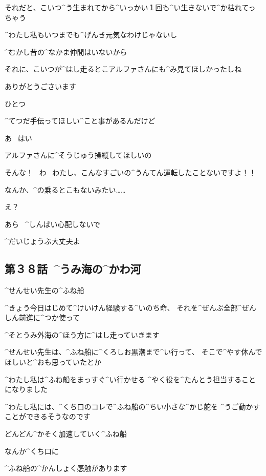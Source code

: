 \Sensei それだと、こいつ^{う}{生}まれてから^{いっかい}{１回}も^{い}{生}きないで^{か}{枯}れてっちゃう

\Sensei ^{わたし}{私}もいつまでも^{げんき}{元気}なわけじゃないし

\Sensei ^{むかし}{昔}の^{なかま}{仲間}はいないから

\Sensei それに、こいつが^{はし}{走}るとこアルファさんにも^{み}{見}てほしかったしね

\page[79]
\Alpha ありがとうごさいます

\Sensei ひとつ

\Sensei ^{てつだ}{手伝}ってほしい^{こと}{事}があるんだけど

\Alpha あ
\ はい

\Sensei アルファさんに^{そうじゅう}{操縦}してほしいの

\page[80]
\Alpha そんな！
\ わ
\ わたし、こんなすごいの^{うんてん}{運転}したことないですよ！！

\Alpha なんか、^{の}{乗}るとこもないみたい……

\Sensei え？

\Sensei あら
\ ^{しんぱい}{心配}しないで

\Sensei ^{だいじょうぶ}{大丈夫}よ


\subsection{第３８話\ ^{うみ}{海}の^{かわ}{河}}

\page[83]
\Alpha ^{せんせい}{先生}の^{ふね}{船}

\Alpha ^{きょう}{今日}はじめて^{けいけん}{経験}する^{いのち}{命}、
それを^{ぜんぶ}{全部}^{ぜんしん}{前進}に^{つか}{使}って

\Alpha ^{そとうみ}{外海}の^{ほう}{方}に^{はし}{走}っていきます

\Alpha ^{せんせい}{先生}は、^{ふね}{船}に^{くろしお}{黒潮}まで^{い}{行}って、
そこで^{やす}{休}んでほしいと^{おも}{思}っていたとか

\page[84]
\Alpha ^{わたし}{私}は^{ふね}{船}をまっすぐ^{い}{行}かせる
^{やく}{役}を^{たんとう}{担当}することになりました

\Alpha ^{わたし}{私}には、^{くち}{口}のコレで^{ふね}{船}の^{ちい}{小}さな^{かじ}{舵}を
^{うご}{動}かすことができるそうなのです

\page[85]
\Alpha どんどん^{かそく}{加速}していく^{ふね}{船}

\page[86]
\Alpha なんか^{くち}{口}に

\Alpha ^{ふね}{船}の^{かんしょく}{感触}があります

